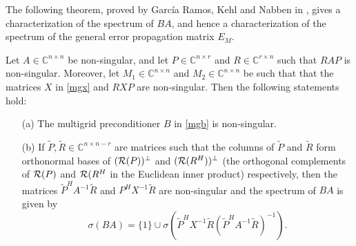 \documentclass[final]{siamltex}
\newcommand{\innCnn}{\in\mathbb{C}^{n\times n}}
\newcommand{\innCrn}{\in\mathbb{C}^{r\times n}}
\newcommand{\innCnr}{\in\mathbb{C}^{n\times r}}
\newcommand{\beqo}{\begin{eqnarray*}}
\newcommand{\eeqo}{\end{eqnarray*}}
\numberwithin{equation}{section}
\newcommand{\im} {{\cal R}}
\newcommand{\bC}{\mathbb{C}}
\begin{document}


The following theorem, proved by Garc{\'i}a Ramos, Kehl  and Nabben in
\cite{GarKN18},
gives a characterization of the spectrum of $BA$, and hence a
characterization of the spectrum of the general error propagation matrix $E_M$.

\begin{theorem} \label{theo:mg:eig}
Let $A \innCnn$ be  non-singular, and let   $P \innCnr $ and  $R \innCrn $ such
that $RAP$ is non-singular. Moreover, let $M_1 \innCnn$ and $M_2 \innCnn $ be
such  that  that the matrices $X$ in \eqref{mgx} and $RXP$ are  non-singular.
Then the following statements hold:
\begin{enumerate}
\item[(a)] The multigrid preconditioner $B$ in
\eqref{mgb}  is non-singular. 

\item[(b)] If $\tilde P, \tilde R \in \bC^{n \times n-r}$ are matrices
such that the columns  of
$\tilde P$ and $\tilde R $ form  orthonormal  bases of $(\im
(P))^\perp$ and
$(\im (R^{H}))^\perp$ (the orthogonal complements of $\im
(P)$ and $\im (R^{H}$ in the Euclidean inner product)  respectively,
then
the
matrices
$\tilde
P^HA^{-1}\tilde
R$ and $P^HX^{-1}\tilde R$
are
non-singular
and the spectrum of
$BA$  is given by
\[\sigma(BA) = \{1\} \cup \sigma(\tilde P^HX^{-1}\tilde R (\tilde
P^HA^{-1}\tilde
R)^{-1}).\]

\end{enumerate}
\end{theorem}
\end{document}
